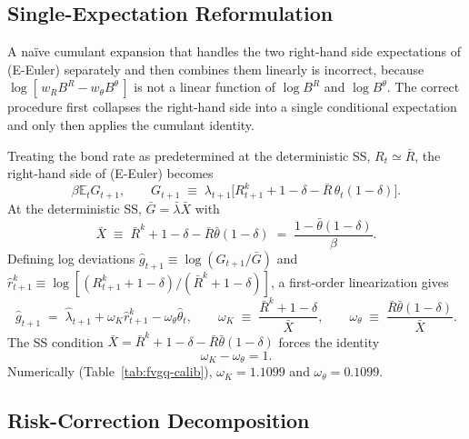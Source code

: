 \documentclass[11pt]{article}
\newcommand{\E}{\mathbb{E}}
\theoremstyle{plain}
\theoremstyle{definition}
\begin{document}
\subsection{Single-Expectation Reformulation}
\label{subsec:single-expectation}

A na\"ive cumulant expansion that handles the two right-hand side
expectations of (E-Euler) separately and then combines them linearly is
incorrect, because $\log[\,w_R B^R - w_\theta B^\theta\,]$ is not a linear
function of $\log B^R$ and $\log B^\theta$. The correct procedure first
collapses the right-hand side into a single conditional expectation and only
then applies the cumulant identity.

Treating the bond rate as predetermined at the deterministic SS,
$R_t \simeq \bar R$, the right-hand side of (E-Euler) becomes
\begin{equation}
\beta \E_t G_{t+1},
\qquad
G_{t+1} \;\equiv\;
\lambda_{t+1} \big[R^k_{t+1} + 1-\delta - \bar R\,\theta_t(1-\delta)\big].
\tag{G-FVGQ}
\end{equation}
At the deterministic SS, $\bar G = \bar\lambda \bar X$ with
\[
\bar X \;\equiv\; \bar R^k + 1-\delta - \bar R \bar\theta(1-\delta)
\;=\; \frac{1-\bar\theta(1-\delta)}{\beta}.
\]
Defining log deviations $\hat g_{t+1} \equiv \log(G_{t+1}/\bar G)$ and
$\hat r^k_{t+1} \equiv \log[(R^k_{t+1}+1-\delta)/(\bar R^k+1-\delta)]$, a
first-order linearization gives
\begin{equation}
\hat g_{t+1}
\;=\;
\hat\lambda_{t+1} + \omega_K \hat r^k_{t+1} - \omega_\theta \hat\theta_t,
\qquad
\omega_K \;\equiv\; \frac{\bar R^k+1-\delta}{\bar X},
\qquad
\omega_\theta \;\equiv\; \frac{\bar R\bar\theta(1-\delta)}{\bar X}.
\tag{$\hat g$-FVGQ}
\end{equation}
The SS condition $\bar X = \bar R^k+1-\delta - \bar R\bar\theta(1-\delta)$
forces the identity
\[
\omega_K - \omega_\theta = 1.
\]
Numerically (Table~\ref{tab:fvgq-calib}), $\omega_K = 1.1099$ and
$\omega_\theta = 0.1099$.

\subsection{Risk-Correction Decomposition}
\end{document}
